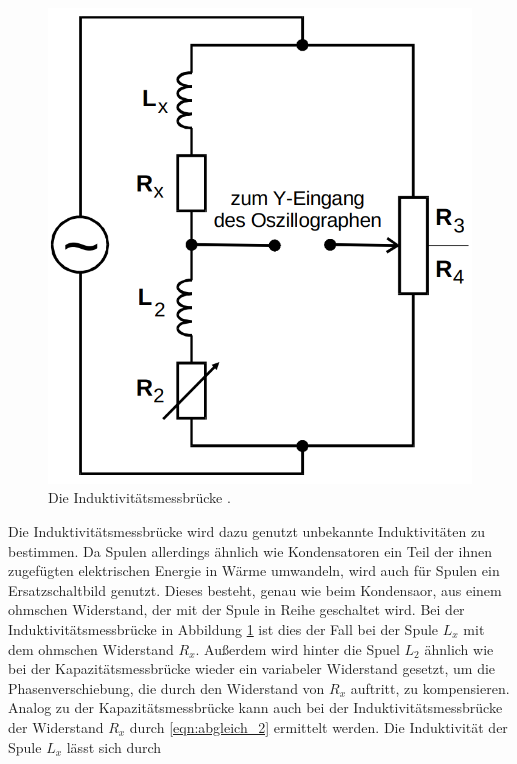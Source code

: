 \begin{figure}
    \centering
    \includegraphics[scale=0.25]{content/Induktivitaetsmessbruecke.png}
    \caption{Die Induktivitätsmessbrücke \cite[S. 221]{anleitung}.}
    \label{fig:induk}
\end{figure}

Die Induktivitätsmessbrücke wird dazu genutzt unbekannte Induktivitäten zu bestimmen.
Da Spulen allerdings ähnlich wie Kondensatoren ein Teil der ihnen zugefügten elektrischen Energie in Wärme umwandeln,
wird auch für Spulen ein Ersatzschaltbild genutzt. Dieses besteht, genau wie beim Kondensaor,
aus einem ohmschen Widerstand, der mit der Spule in Reihe geschaltet wird.
Bei der Induktivitätsmessbrücke in Abbildung \ref{fig:induk} ist dies der Fall bei der Spule $L_x$ mit dem ohmschen Widerstand $R_x$.
Außerdem wird hinter die Spuel $L_2$ ähnlich wie bei der Kapazitätsmessbrücke wieder ein variabeler Widerstand gesetzt, 
um die Phasenverschiebung, die durch den Widerstand von $R_x$ auftritt, zu kompensieren.
Analog zu der Kapazitätsmessbrücke kann auch bei der Induktivitätsmessbrücke der Widerstand $R_x$ durch \eqref{eqn:abgleich_2} ermittelt werden.
Die Induktivität der Spule $L_x$ lässt sich durch

